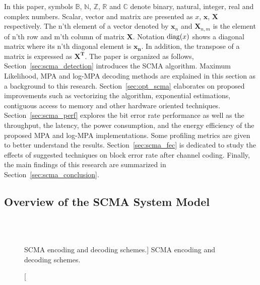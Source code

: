 In this paper, symbols $\mathbb{B}$, $\mathbb{N}$, $\mathbb{Z}$, $\mathbb{R}$
and $\mathbb{C}$ denote binary, natural, integer, real and complex numbers.
Scalar, vector and matrix are presented as $x$, $\bm{x}$, $\bm{X}$ respectively.
The n'th element of a vector denoted by $\bm{x}_n$ and $\bm{X}_{n,m}$ is the
element of n'th row and m'th column of matrix $\bm{X}$. Notation $\operatorname{diag}(x)$
shows a diagonal matrix where its n'th diagonal element is $\bm{x_n}$. In
addition, the transpose of a matrix is expressed as $\bm{X^T}$. The paper is
organized as follows, Section~\ref{sec:scma_detection} introduces the SCMA
algorithm. Maximum Likelihood, MPA and log-MPA decoding methods are explained in
this section as a background to this research.
Section~\ref{sec:opt_scma} elaborates on proposed improvements such as
vectorizing the algorithm, exponential estimations, contiguous access to memory
and other hardware oriented techniques. Section~\ref{sec:scma_perf} explores the
bit error rate performance as well as the throughput, the latency, the power
consumption, and the energy efficiency of the proposed MPA and log-MPA
implementations. Some profiling metrics are given to better understand the
results. Section~\ref{sec:scma_fec} is dedicated to study the effects of
suggested techniques on block error rate after channel coding. Finally, the main
findings of this research are summarized in Section~\ref{sec:scma_conclusion}.

\subsection{Overview of the SCMA System Model}
\label{sec:scma_overview}

\begin{figure}[htp]
  \centering
  \\
  \\
  \quad
  \caption
    [SCMA encoding and decoding schemes.]
    {SCMA encoding and decoding schemes.}
  \label{fig:scma}
\end{figure}

